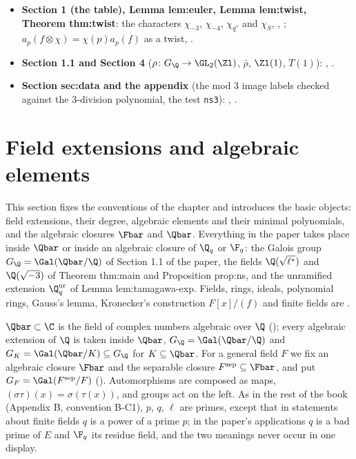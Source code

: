 \begin{itemize}
, .
\item \textbf{Section 1 (the table), Lemma lem:euler, Lemma lem:twist, Theorem thm:twist}: the characters $\chi_{-3}$, $\chi_{-4}$, $\chi_{q^*}$ and
$\chi_S$, , ; $a_p(f\otimes\chi)=\chi(p)a_p(f)$ as a twist, .
\item \textbf{Section 1.1 and Section 4} ($\rho\colon G_\Q\to\GL_2(\Zl)$, $\bar\rho$, $\Zl(1)$, $T(1)$): ,
.
\item \textbf{Section sec:data and the appendix} (the mod $3$ image labels checked against the $3$-division polynomial, the test \texttt{ns3}):
, .
\end{itemize}

\section{Field extensions and algebraic elements}\label{sec:galois:extensions}

This section fixes the conventions of the chapter and introduces the basic objects: field extensions, their degree, algebraic elements and
their minimal polynomials, and the algebraic closures $\Fbar$ and $\Qbar$. Everything in the paper takes place inside $\Qbar$ or inside an
algebraic closure of $\Q_q$ or $\F_q$: the Galois group $G_\Q=\Gal(\Qbar/\Q)$ of Section 1.1 of the paper, the fields $\Q(\sqrt{\ell^*})$ and
$\Q(\sqrt{-3})$ of Theorem thm:main and Proposition prop:ns, and the unramified extension $\Q_q^{\mathrm{ur}}$ of Lemma lem:tamagawa-exp. Fields,
rings, ideals, polynomial rings, Gauss's lemma, Kronecker's construction $F[x]/(f)$ and finite fields are .

\begin{convention}\label{conv:galois:fields}
$\Qbar\subset\C$ is the field of complex numbers algebraic over $\Q$ (); every algebraic extension of $\Q$ is taken inside
$\Qbar$, $G_\Q=\Gal(\Qbar/\Q)$ and $G_K=\Gal(\Qbar/K)\subseteq G_\Q$ for $K\subseteq\Qbar$. For a general field $F$ we fix an algebraic closure $\Fbar$ and
the separable closure $F^{\mathrm{sep}}\subseteq\Fbar$, and put $G_F=\Gal(F^{\mathrm{sep}}/F)$ (). Automorphisms are composed as
maps, $(\sigma\tau)(x)=\sigma(\tau(x))$, and groups act on the left. As in the rest of the book (Appendix B, convention B-C1), $p$, $q$, $\ell$ are primes,
except that in statements about finite fields $q$ is a power of a prime $p$; in the paper's applications $q$ is a bad prime of $E$ and $\F_q$ its
residue field, and the two meanings never occur in one display.
\end{convention}

